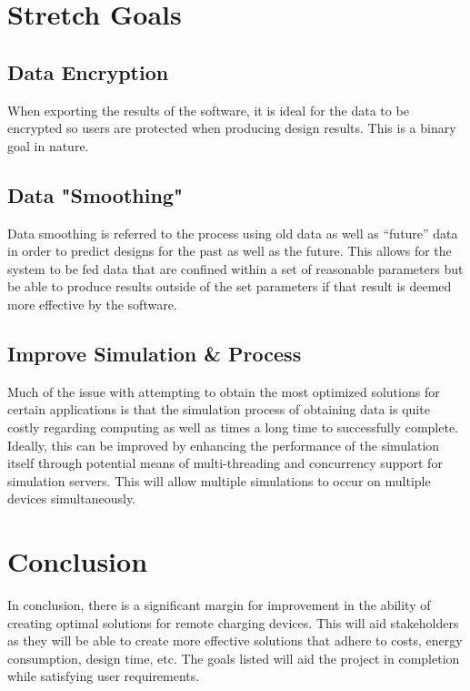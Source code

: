 \documentclass[12pt,a4]{report}
\begin{document}
\section*{Stretch Goals}
\subsection*{Data Encryption}
When exporting the results of the software, it is ideal for the data to be encrypted so users are protected when producing design results. This is a binary goal in nature.

\subsection*{Data "Smoothing"}
Data smoothing is referred to the process using old data as well as “future” data in order to predict designs for the past as well as the future. This allows for the system to be fed data that are confined within a set of reasonable parameters but be able to produce results outside of the set parameters if that result is deemed more effective by the software.

\subsection*{Improve Simulation \& Process}
Much of the issue with attempting to obtain the most optimized solutions for certain applications is that the simulation process of obtaining data is quite costly regarding computing as well as times a long time to successfully complete. Ideally, this can be improved by enhancing the performance of the simulation itself through potential means of multi-threading and concurrency support for simulation servers. This will allow multiple simulations to occur on multiple devices simultaneously. 

\section*{Conclusion}
In conclusion, there is a significant margin for improvement in the ability of creating optimal solutions for remote charging devices. This will aid stakeholders as they will be able to create more effective solutions that adhere to costs, energy consumption, design time, etc. The goals listed will aid the project in completion while satisfying user requirements.
\end{document}

